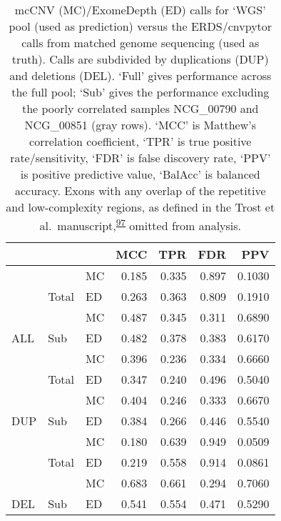 \documentclass[11pt,letterpaper]{book}
\begin{document}
\begin{table}

\caption[mcCNV and ExomeDepth performance predicting calls from genome sequencing.]{\label{tab:predMet}mcCNV (MC)/ExomeDepth (ED) calls for `WGS' pool (used as prediction) versus the ERDS/cnvpytor calls from matched genome sequencing (used as truth). Calls are subdivided by duplications (DUP) and deletions (DEL). `Full' gives performance across the full pool; `Sub' gives the performance excluding the poorly correlated samples NCG\_00790 and NCG\_00851 (gray rows). `MCC' is Matthew's correlation coefficient, `TPR' is true positive rate/sensitivity, `FDR' is false discovery rate, `PPV' is positive predictive value, `BalAcc' is balanced accuracy. Exons with any overlap of the repetitive and low-complexity regions, as defined in the Trost et al.~manuscript,\textsuperscript{\protect\hyperlink{ref-trost:2018aa}{97}} omitted from analysis.}
\centering
\begin{tabular}[t]{lllrrrr}
\toprule
 &  &  & MCC & TPR & FDR & PPV\\
\midrule
 &  & MC & 0.185 & 0.335 & 0.897 & 0.1030\\
\cmidrule{3-7}
 & \multirow{-2}{*}{\raggedright\arraybackslash Total} & ED & 0.263 & 0.363 & 0.809 & 0.1910\\
\cmidrule{2-7}
 &  & MC & 0.487 & 0.345 & 0.311 & 0.6890\\
\cmidrule{3-7}
\multirow{-4}{*}{\raggedright\arraybackslash ALL} & \multirow{-2}{*}{\raggedright\arraybackslash Sub} & ED & 0.482 & 0.378 & 0.383 & 0.6170\\
\cmidrule{1-7}
 &  & MC & 0.396 & 0.236 & 0.334 & 0.6660\\
\cmidrule{3-7}
 & \multirow{-2}{*}{\raggedright\arraybackslash Total} & ED & 0.347 & 0.240 & 0.496 & 0.5040\\
\cmidrule{2-7}
 &  & MC & 0.404 & 0.246 & 0.333 & 0.6670\\
\cmidrule{3-7}
\multirow{-4}{*}{\raggedright\arraybackslash DUP} & \multirow{-2}{*}{\raggedright\arraybackslash Sub} & ED & 0.384 & 0.266 & 0.446 & 0.5540\\
\cmidrule{1-7}
 &  & MC & 0.180 & 0.639 & 0.949 & 0.0509\\
\cmidrule{3-7}
 & \multirow{-2}{*}{\raggedright\arraybackslash Total} & ED & 0.219 & 0.558 & 0.914 & 0.0861\\
\cmidrule{2-7}
 &  & MC & 0.683 & 0.661 & 0.294 & 0.7060\\
\cmidrule{3-7}
\multirow{-4}{*}{\raggedright\arraybackslash DEL} & \multirow{-2}{*}{\raggedright\arraybackslash Sub} & ED & 0.541 & 0.554 & 0.471 & 0.5290\\
\bottomrule
\end{tabular}
\end{table}
\end{document}
